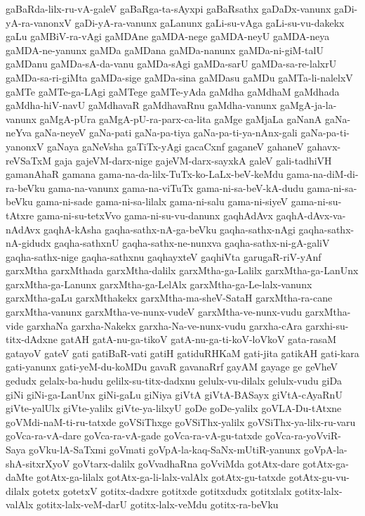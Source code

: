 {gaBaRda-lilx-ru-vA-galeV
gaBaRga-ta-sAyxpi
gaBaRsathx
gaDaDx-vanunx
gaDi-yA-ra-vanonxV
gaDi-yA-ra-vanunx
gaLanunx
gaLi-su-vAga
gaLi-su-vu-dakekx
gaLu
gaMBiV-ra-vAgi
gaMDAne
gaMDA-nege
gaMDA-neyU
gaMDA-neya
gaMDA-ne-yanunx
gaMDa
gaMDana
gaMDa-nanunx
gaMDa-ni-giM-talU
gaMDanu
gaMDa-sA-da-vanu
gaMDa-sAgi
gaMDa-sarU
gaMDa-sa-re-lalxrU
gaMDa-sa-ri-giMta
gaMDa-sige
gaMDa-sina
gaMDasu
gaMDu
gaMTa-li-nalelxV
gaMTe
gaMTe-ga-LAgi
gaMTege
gaMTe-yAda
gaMdha
gaMdhaM
gaMdhada
gaMdha-hiV-navU
gaMdhavaR
gaMdhavaRnu
gaMdha-vanunx
gaMgA-ja-la-vanunx
gaMgA-pUra
gaMgA-pU-ra-parx-ca-lita
gaMge
gaMjaLa
gaNanA
gaNa-neYva
gaNa-neyeV
gaNa-pati
gaNa-pa-tiya
gaNa-pa-ti-ya-nAnx-gali
gaNa-pa-ti-yanonxV
gaNaya
gaNeVsha
gaTiTx-yAgi
gacaCxnf
gaganeV
gahaneV
gahavx-reVSaTxM
gaja
gajeVM-darx-nige
gajeVM-darx-sayxkA
galeV
gali-tadhiVH
gamanAhaR
gamana
gama-na-da-lilx-TuTx-ko-LaLx-beV-keMdu
gama-na-diM-di-ra-beVku
gama-na-vanunx
gama-na-viTuTx
gama-ni-sa-beV-kA-dudu
gama-ni-sa-beVku
gama-ni-sade
gama-ni-sa-lilalx
gama-ni-salu
gama-ni-siyeV
gama-ni-su-tAtxre
gama-ni-su-tetxVvo
gama-ni-su-vu-danunx
gaqhAdAvx
gaqhA-dAvx-va-nAdAvx
gaqhA-kAsha
gaqha-sathx-nA-ga-beVku
gaqha-sathx-nAgi
gaqha-sathx-nA-gidudx
gaqha-sathxnU
gaqha-sathx-ne-nunxva
gaqha-sathx-ni-gA-galiV
gaqha-sathx-nige
gaqha-sathxnu
gaqhayxteV
gaqhiVta
garugaR-riV-yAnf
garxMtha
garxMthada
garxMtha-dalilx
garxMtha-ga-Lalilx
garxMtha-ga-LanUnx
garxMtha-ga-Lanunx
garxMtha-ga-LelAlx
garxMtha-ga-Le-lalx-vanunx
garxMtha-gaLu
garxMthakekx
garxMtha-ma-sheV-SataH
garxMtha-ra-cane
garxMtha-vanunx
garxMtha-ve-nunx-vudeV
garxMtha-ve-nunx-vudu
garxMtha-vide
garxhaNa
garxha-Nakekx
garxha-Na-ve-nunx-vudu
garxha-cAra
garxhi-su-titx-dAdxne
gatAH
gatA-nu-ga-tikoV
gatA-nu-ga-ti-koV-loVkoV
gata-rasaM
gatayoV
gateV
gati
gatiBaR-vati
gatiH
gatiduRHKaM
gati-jita
gatikAH
gati-kara
gati-yanunx
gati-yeM-du-koMDu
gavaR
gavanaRrf
gayAM
gayage
ge
geVheV
gedudx
gelalx-ba-hudu
gelilx-su-titx-dadxnu
gelulx-vu-dilalx
gelulx-vudu
giDa
giNi
giNi-ga-LanUnx
giNi-gaLu
giNiya
giVtA
giVtA-BASayx
giVtA-cAyaRnU
giVte-yalUlx
giVte-yalilx
giVte-ya-lilxyU
goDe
goDe-yalilx
goVLA-Du-tAtxne
goVMdi-naM-ti-ru-tatxde
goVSiThxge
goVSiThx-yalilx
goVSiThx-ya-lilx-ru-varu
goVca-ra-vA-dare
goVca-ra-vA-gade
goVca-ra-vA-gu-tatxde
goVca-ra-yoVviR-Saya
goVku-lA-SaTxmi
goVmati
goVpA-la-kaq-SaNx-mUtiR-yanunx
goVpA-la-shA-sitxrXyoV
goVtarx-dalilx
goVvadhaRna
goVviMda
gotAtx-dare
gotAtx-ga-daMte
gotAtx-ga-lilalx
gotAtx-ga-li-lalx-valAlx
gotAtx-gu-tatxde
gotAtx-gu-vu-dilalx
gotetx
gotetxV
gotitx-dadxre
gotitxde
gotitxdudx
gotitxlalx
gotitx-lalx-valAlx
gotitx-lalx-veM-darU
gotitx-lalx-veMdu
gotitx-ra-beVku
}
